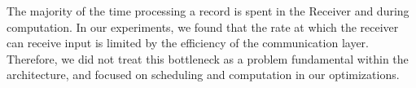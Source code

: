 The majority of the time processing a record is spent in the Receiver and during computation. 
In our experiments, we found that the rate at which the receiver can receive input is limited by the efficiency of the communication layer.
Therefore, we did not treat this bottleneck as a problem fundamental within the architecture, and focused on scheduling and computation in our optimizations.


%
%
%

